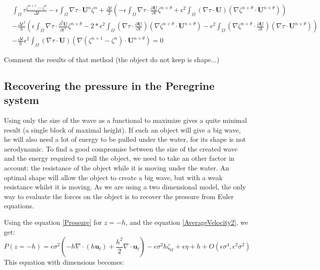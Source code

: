 \documentclass[11pt,a4paper]{article}
\begin{document}
					\begin{align*}
						& \displaystyle \int_{\Omega}{\! \tau \frac{\zeta^{n+1} - \zeta^n}{\Delta t}}  -   \epsilon \int_{\Omega}{\! \nabla \tau \cdot  \mathbf{U}^n  \zeta^n} + \frac{\Delta t}{2}\left( - \epsilon \int_{\Omega}{\! \nabla \tau \cdot \frac{\partial \mathbf{U}}{\partial t} \zeta^{n+\theta}}
						 +  \epsilon^2 \int_{\Omega}{\! (\nabla \tau \cdot \mathbf{U})(\nabla \zeta^{n+\theta} \cdot \mathbf{U}^{n+\theta})}\right) \\
						 & -\frac{\Delta t^2}{6}\left(\epsilon \int_{\Omega}{\! \nabla \tau \cdot \frac{\partial^2 \mathbf{U}}{\partial t^2} \zeta^{n+\theta}} -2*\epsilon^2 \int_{\Omega}{\! (\nabla \tau \cdot \frac{\partial \mathbf{U}}{\partial t})(\nabla \zeta^{n+\theta} \cdot \mathbf{U}^{n+\theta})} -\epsilon^2 \int_{\Omega}{\! (\nabla \zeta^{n+\theta} \cdot \frac{\partial \mathbf{U}}{\partial t})(\nabla \tau \cdot \mathbf{U}^{n+\theta})}\right) \\
						 & -\frac{\Delta t}{6} \epsilon^2 \int_{\Omega}{\! (\nabla \tau \cdot \mathbf{U})(\nabla (\zeta^{n+1} -  \zeta^n) \cdot \mathbf{U}^{n+\theta})}  = 0
					\end{align*}
					
					Comment the results of that method (the object do not keep is shape...)
				
				\pagebreak
				\subsection{Recovering the pressure in the Peregrine system}		
				Using only the size of the wave as a functional to maximize gives a quite minimal result (a single block of maximal height). If such an object will give a big wave, he will also need a lot of energy to be pulled under the water, for its shape is not aerodynamic. To find a good compromise between the size of the created wave and the energy required to pull the object, we need to take an other factor in account: the resistance of the object while it is moving under the water. An optimal shape will allow the object to create a big wave, but with a weak resistance whilst it is moving. As we are using a two dimensional model, the only way to evaluate the forces on the object is to recover the pressure from Euler equations.
				
				Using the equation \eqref{Pressure} for $ z = -h$, and the equation \eqref{AverageVelocity2}, we get:
			\begin{equation}
				P(z=-h) = \epsilon \sigma^2(-h\nabla \cdot (h \mathbf{u}_t) + \frac{h^2}{2} \nabla \cdot \mathbf{u}_t) - \epsilon \sigma^2 h \zeta_{tt} + \epsilon \eta + h + O(\epsilon\sigma^4, \epsilon^2 \sigma^2)
			\end{equation}			
			This equation with dimensions becomes:
			
\end{document}
